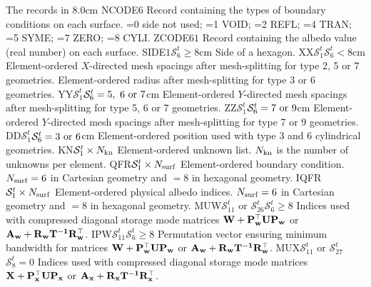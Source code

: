 \begin{DescriptionEnregistrement}{The  records in
}{8.0cm}
\IntEnr
  {NCODE}{$6$}
  {Record containing the types of boundary conditions on each surface. =0 side
   not used; =1 VOID; =2 REFL; =4 TRAN; =5 SYME; =7 ZERO; =8 CYLI.} 
\RealEnr
  {ZCODE}{$6$}{$1$}
  {Record containing the albedo value (real number) on each surface.} 
\OptRealEnr
  {SIDE}{$1$}{$\mathcal{S}^{t}_{6}\ge 8$}{cm}
  {Side of a hexagon.} 
\OptRealEnr
  {XX}{$\mathcal{S}^{t}_{1}$}{$\mathcal{S}^{t}_{6}<8$}{cm}
  {Element-ordered $X$-directed mesh spacings after mesh-splitting for type 2, 5
   or 7 geometries. Element-ordered radius after mesh-splitting for type 3
   or 6 geometries.} 
\OptRealEnr
  {YY}{$\mathcal{S}^{t}_{1}$}{$\mathcal{S}^{t}_{6}=5, \ 6 \ {\rm or} \ 7$}{cm}
  {Element-ordered $Y$-directed mesh spacings after mesh-splitting for type 5, 6
   or 7 geometries.} 
\OptRealEnr
  {ZZ}{$\mathcal{S}^{t}_{1}$}{$\mathcal{S}^{t}_{6}=7 \ {\rm or} \ 9$}{cm}
  {Element-ordered $Y$-directed mesh spacings after mesh-splitting for type 7
   or 9 geometries.} 
\OptRealEnr
  {DD}{$\mathcal{S}^{t}_{1}$}{$\mathcal{S}^{t}_{6}=3 \ {\rm or} \ 6$}{cm}
  {Element-ordered position used with type 3 and 6 cylindrical geometries.} 
\IntEnr
  {KN}{$\mathcal{S}^{t}_{1}\times N_{\rm kn}$}
  {Element-ordered unknown list. $N_{\rm kn}$ is the number of unknowns per element.} 
\RealEnr
  {QFR}{$\mathcal{S}^{t}_{1}\times N_{\rm surf}$}{}
  {Element-ordered boundary condition. $N_{\rm surf}=6$ in Cartesian geometry and $=8$ in hexagonal geometry.} 
\IntEnr
  {IQFR}{$\mathcal{S}^{t}_{1}\times N_{\rm surf}$}
  {Element-ordered physical albedo indices. $N_{\rm surf}=6$ in Cartesian geometry and $=8$ in hexagonal geometry.} 
\OptIntEnr
  {MUW}{$\mathcal{S}^{t}_{11}$ or $\mathcal{S}^{t}_{26}$}{$\mathcal{S}^{t}_{6}\ge 8$}
  {Indices used with compressed diagonal storage mode matrices $\bf{W}+\bf{P}_w^\top \bf{U}\bf{P}_w$ or $\bf{A}_w+\bf{R}_w\bf{T}^{-1}\bf{R}_w^\top$.} 
\OptIntEnr
  {IPW}{$\mathcal{S}^{t}_{11}$}{$\mathcal{S}^{t}_{6}\ge 8$}
  {Permutation vector ensuring minimum bandwidth for matrices $\bf{W}+\bf{P}_w^\top \bf{U}\bf{P}_w$ or $\bf{A}_w+\bf{R}_w\bf{T}^{-1}\bf{R}_w^\top$.} 
\OptIntEnr
  {MUX}{$\mathcal{S}^{t}_{11}$ or $\mathcal{S}^{t}_{27}$}{$\mathcal{S}^{t}_{8}=0$}
  {Indices used with compressed diagonal storage mode matrices $\bf{X}+\bf{P}_x^\top \bf{U}\bf{P}_x$ or $\bf{A}_x+\bf{R}_x\bf{T}^{-1}\bf{R}_x^\top$.} 
\IntEnr

\end{DescriptionEnregistrement}
